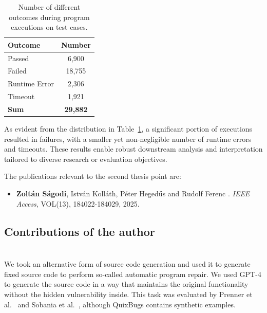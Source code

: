 \documentclass[12pt,a4paper]{extarticle}
\begin{document}
\begin{table}[h]
	\centering
	\begin{tabular}{|l|c|}
		\hline
		\textbf{Outcome} & \textbf{Number}  \\ \hline
		Passed           & 6,900            \\ \hline
		Failed           & 18,755           \\ \hline
		Runtime Error    & 2,306            \\ \hline
		Timeout          & 1,921            \\ \hline
		\textbf{Sum}     & \textbf{29,882}  \\ \hline
	\end{tabular}
	\caption{Number of different outcomes during program executions on test cases.}
	\label{th4:table:outcomes}
\end{table}

As evident from the distribution in Table~\ref{th4:table:outcomes}, a significant portion of executions resulted in failures, with a smaller yet non-negligible number of runtime errors and timeouts.
These results enable robust downstream analysis and interpretation tailored to diverse research or evaluation objectives.

\vspace{2em}
The publications relevant to the second thesis point are:
\begin{itemize}
	\item \textbf{Zoltán Ságodi}, István Kolláth, Péter Heged\H{u}s and Rudolf Ferenc
	.
	\newblock \emph{IEEE Access}, VOL(13), 184022-184029, 2025.
\end{itemize}

\subsection*{Contributions of the author}





\section{\thesispointthreeuf}

We took an alternative form of source code generation and used it to generate fixed source code to perform so-called automatic program repair.
We used GPT-4 to generate the source code in a way that maintains the original functionality without the hidden vulnerability inside.
This task was evaluated by Prenner et al.~\cite{codex_bug_fix} and Sobania et al.~\cite{quix_bugs_abuser_2}, although QuixBugs contains synthetic examples.
\end{document}
